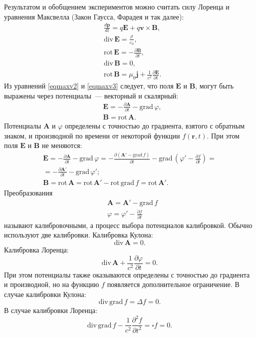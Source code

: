 \documentclass[a4paper,14pt]{extreport} %
\newcommand{\dff}[2]{\frac{\partial #1}{\partial #2}}
\newcommand{\dfs}[2]{\frac{\partial^2 #1}{\partial #2^2}}
\newcommand{\Dff}[2]{\frac{d #1}{d #2}}
\renewcommand{\vec}[1]{\boldsymbol{#1}}
\renewcommand{\div}{\mathrm{div}\,}
\newcommand{\rot}{\mathrm{rot}\,}
\newcommand{\grad}{\mathrm{grad}\,}
\newcommand{\eps}{\varepsilon}
\begin{document}
	Результатом и обобщением экспериментов можно считать силу Лоренца и уравнения Максвелла (Закон Гаусса, Фарадея и так далее):
	\begin{align}
		& \Dff{\vec{p}}{t} = q \vec{E} + q \vec{v} \times \vec{B}, \label{eqlor}\\
		& \div \vec{E} = \frac{\rho}{\eps_0}, \label{eqmaxv1}\\
		& \rot \vec{E} = - \dff{\vec{B}}{t}, \label{eqmaxv2}\\
		& \div \vec{B} = 0, \label{eqmaxv3}\\
		& \rot \vec{B} = \mu_0 \vec{j} + \frac{1}{c^2} \dff{\vec{E}}{t}.\label{eqmaxv4}
	\end{align}
	Из уравнений \eqref{eqmaxv2} и \eqref{eqmaxv3} следует, что поля $\vec{E}$ и $\vec{B}$, могут быть выражены через потенциалы~--- векторный и скалярный:
	\begin{align}
		& \vec{E} = - \dff{\vec{A}}{t} - \grad \varphi, \label{eqvece}\\
		& \vec{B} = \rot \vec{A}. \label{eqvecb}
	\end{align}
	Потенциалы $\vec{A}$ и $\varphi$ определены с точностью до градиента, взятого с обратным знаком, и производной по времени от некоторой функции $f(\vec{r}, t)$. При этом поля $\vec{E}$ и $\vec{B}$ не меняются:
	\begin{gather*}
		\vec{E} = - \dff{\vec{A}}{t} - \grad \varphi = - \dff{(\vec{A}' - \grad f)}{t}  - \grad \left(\varphi' - \dff{f}{t}\right) = \\ 
		= - \dff{\vec{A}'}{t} - \grad \varphi'; \\
		\vec{B} = \rot \vec{A} = \rot \vec{A}' - \rot \grad f = \rot \vec{A}'.
	\end{gather*}
	Преобразования 
	\begin{align*}
		& \vec{A} = \vec{A}' - \grad f \\
		& \varphi = \varphi' - \dff{f}{t}
	\end{align*}
	называют калибровочными, а процесс выбора потенциалов калибровкой. Обычно используют две калибровки. Калибровка Кулона:
	\begin{equation*}
		\div \vec{A} = 0.
	\end{equation*}
	Калибровка Лоренца:
	\begin{equation*}
		\div \vec{A} + \frac{1}{c^2}\dff{\varphi}{t} = 0.
	\end{equation*}
	При этом потенциалы также оказываются определены с точностью до градиента и производной, но на функцию $f$ появляется дополнительное ограничение. В случае калибровки Кулона:
	\begin{equation*}
		\div \grad f = \Delta f = 0.
	\end{equation*}
	В случае калибровки Лоренца:
	\begin{equation*}
		\div \grad f - \frac{1}{c^2}\dfs{f}{t} = \square f = 0.
	\end{equation*}
	
\end{document}
